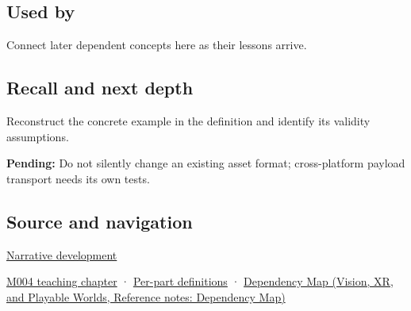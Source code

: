 \subsection{Used by}\label{appendix-e90053a4b201-used-by}

\hypertarget{appendix-e90053a4b201-used-by}{}

Connect later dependent concepts here as their lessons arrive.

\subsection{Recall and next depth}\label{appendix-e90053a4b201-recall-and-next-depth}

\hypertarget{appendix-e90053a4b201-recall-and-next-depth}{}

Reconstruct the concrete example in the definition and identify its validity assumptions.

\textbf{Pending:} Do not silently change an existing asset format; cross-platform payload transport needs its own tests.

\subsection{Source and navigation}\label{appendix-e90053a4b201-source-and-navigation}

\hypertarget{appendix-e90053a4b201-source-and-navigation}{}

\hyperref[01-foundations-i-ch001-choosing-what-information-to-keep]{Narrative development}

\hyperref[01-foundations-i-ch001-a-stretching-ruler-for-real-valued-quantities]{M004 teaching chapter} · \hyperref[appendix-fd090d982a15-m004---parts-61-76]{Per-part definitions} · \href{../07-Vision-XR-and-Playable-Worlds/main.pdf\#nameddest=appendix-4ad47bdd269a}{Dependency Map (Vision, XR, and Playable Worlds, Reference notes: Dependency Map)}
